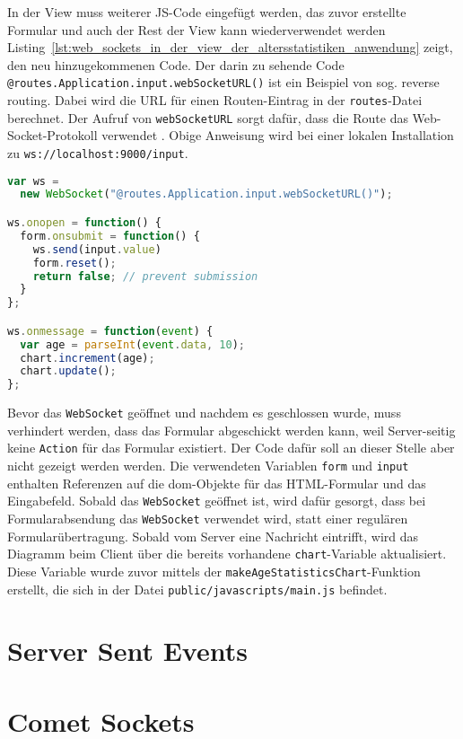In der View muss weiterer JS-Code eingefügt werden, das zuvor erstellte Formular und auch der Rest der View kann wiederverwendet werden
Listing~\ref{lst:web_sockets_in_der_view_der_altersstatistiken_anwendung} zeigt, den neu hinzugekommenen Code.
Der darin zu sehende Code \lstinline|@routes.Application.input.webSocketURL()| ist ein Beispiel von sog. reverse routing.
Dabei wird die URL für einen Routen-Eintrag in der \lstinline|routes|-Datei berechnet.
Der Aufruf von \lstinline|webSocketURL| sorgt dafür, dass die Route das Web-Socket-Protokoll verwendet \cite[vgl.][S.~117, 355]{play_for_scala_v8}.
Obige Anweisung wird bei einer lokalen Installation zu \lstinline[language=sh]|ws://localhost:9000/input|.

\begin{lstlisting}[language=javascript, caption=Web-Sockets in der View der Altersstatistiken-Anwendung, label=lst:web_sockets_in_der_view_der_altersstatistiken_anwendung]
var ws =
  new WebSocket("@routes.Application.input.webSocketURL()");

ws.onopen = function() {
  form.onsubmit = function() {
    ws.send(input.value)
    form.reset();
    return false; // prevent submission
  }
};

ws.onmessage = function(event) {
  var age = parseInt(event.data, 10);
  chart.increment(age);
  chart.update();
};
\end{lstlisting}

Bevor das \lstinline|WebSocket| geöffnet und nachdem es geschlossen wurde, muss verhindert werden, dass das Formular abgeschickt werden kann, weil Server-seitig keine \lstinline|Action| für das Formular existiert.
Der Code dafür soll an dieser Stelle aber nicht gezeigt werden werden.
Die verwendeten Variablen \lstinline|form| und \lstinline|input| enthalten Referenzen auf die \gls{dom}-Objekte für das HTML-Formular und das Eingabefeld.
Sobald das \lstinline|WebSocket| geöffnet ist, wird dafür gesorgt, dass bei Formularabsendung das \lstinline|WebSocket| verwendet wird, statt einer regulären Formularübertragung.
Sobald vom Server eine Nachricht eintrifft, wird das Diagramm beim Client über die bereits vorhandene \lstinline|chart|-Variable aktualisiert.
Diese Variable wurde zuvor mittels der \lstinline|makeAgeStatisticsChart|-Funktion erstellt, die sich in der Datei \lstinline|public/javascripts/main.js| befindet.



\section{Server Sent Events} %
\label{sec:server_sent_events}


\section{Comet Sockets} %
\label{sec:comet_sockets}


